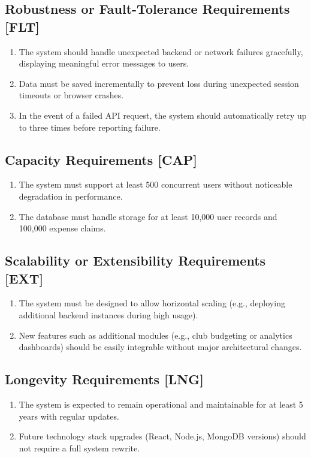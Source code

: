 \documentclass[12pt]{article}
\begin{document}
  \subsection{Robustness or Fault-Tolerance Requirements [FLT]}
    \begin{enumerate}
        \item The system should handle unexpected backend or network failures gracefully, displaying meaningful error messages to users.
        \item Data must be saved incrementally to prevent loss during unexpected session timeouts or browser crashes.
        \item In the event of a failed API request, the system should automatically retry up to three times before reporting failure.
    \end{enumerate}

  \subsection{Capacity Requirements [CAP]}
    \begin{enumerate}
        \item The system must support at least 500 concurrent users without noticeable degradation in performance.
        \item The database must handle storage for at least 10,000 user records and 100,000 expense claims.
    \end{enumerate}

  \subsection{Scalability or Extensibility Requirements [EXT]}
    \begin{enumerate}
        \item The system must be designed to allow horizontal scaling (e.g., deploying additional backend instances during high usage).
        \item New features such as additional modules (e.g., club budgeting or analytics dashboards) should be easily integrable without major architectural changes.
    \end{enumerate}

  \subsection{Longevity Requirements [LNG]}
    \begin{enumerate}
        \item The system is expected to remain operational and maintainable for at least 5 years with regular updates.
        \item Future technology stack upgrades (React, Node.js, MongoDB versions) should not require a full system rewrite.
    \end{enumerate}
\end{document}
